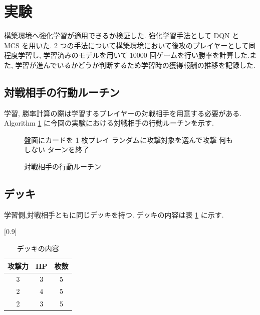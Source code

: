 \documentclass[twocolumn]{jarticle}
\begin{document}
\section{実験}
構築環境へ強化学習が適用できるか検証した.
強化学習手法として DQN と MCS を用いた. 2 つの手法について構築環境において後攻のプレイヤーとして同程度学習し, 学習済みのモデルを用いて 10000 回ゲームを行い勝率を計算した.また, 学習が進んでいるかどうか判断するため学習時の獲得報酬の推移を記録した.

\subsection{対戦相手の行動ルーチン}

学習, 勝率計算の際は学習するプレイヤーの対戦相手を用意する必要がある.
Algorithm \ref{alg1} に今回の実験における対戦相手の行動ルーチンを示す.
\begin{figure}[t]
  \begin{algorithm}[H]
      \caption{
        対戦相手の行動ルーチン
        }
      \label{alg1}
      \begin{algorithmic}[1] 
      \STATE 盤面にカードを 1 枚プレイ
      \STATE ランダムに攻撃対象を選んで攻撃
      \ELSE
      \STATE 何もしない
      \ENDIF
      \ENDFOR
      \STATE ターンを終了
      \end{algorithmic}
  \end{algorithm}
  \end{figure}


\subsection{デッキ}
学習側,対戦相手ともに同じデッキを持つ.
デッキの内容は表 \ref{table:deck} に示す.
\begin{table}[t]
  \centering
  \caption{デッキの内容}
  \label{table:deck}
  \vspace{-0.3cm}
  \scalebox{0.9}[0.9]{
    \begin{tabular}{|c|c|c|}
      \hline
      攻撃力 &  HP  & 枚数 \\ \hline \hline
      3 & 3 & 5  \\ \hline
      2 & 4 & 5  \\ \hline
      2 & 3 & 5  \\ \hline
      \end{tabular}
  }
  \end{table}
\end{document}
